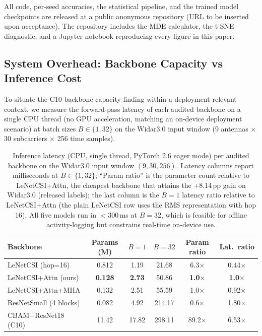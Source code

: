 \documentclass[11pt]{article}
\theoremstyle{definition}
\begin{document}
All code, per-seed accuracies, the statistical pipeline, and the trained model checkpoints are released at a public anonymous repository (URL to be inserted upon acceptance). The repository includes the MDE calculator, the t-SNE diagnostic, and a Jupyter notebook reproducing every figure in this paper.

\subsection{System Overhead: Backbone Capacity vs Inference Cost}
\label{sec:system_overhead}

To situate the C10 backbone-capacity finding within a deployment-relevant context, we measure the forward-pass latency of each audited backbone on a single CPU thread (no GPU acceleration, matching an on-device deployment scenario) at batch sizes $B \in \{1, 32\}$ on the Widar3.0 input window (9 antennas $\times$ 30 subcarriers $\times$ 256 time samples).

\begin{table}[h]
    \centering
    \caption{Inference latency (CPU, single thread, PyTorch 2.6 eager mode) per audited backbone on the Widar3.0 input window $(9, 30, 256)$. Latency columns report milliseconds at $B \in \{1, 32\}$; ``Param ratio'' is the parameter count relative to LeNetCSI+Attn, the cheapest backbone that attains the +8.14\,pp gain on Widar3.0 (released labels); the last column is the $B{=}1$ latency ratio relative to LeNetCSI+Attn (the plain LeNetCSI row uses the RMS representation with hop 16). All five models run in $<300$\,ms at $B = 32$, which is feasible for offline activity-logging but constrains real-time on-device use.}
    \label{tab:latency}
    \footnotesize
    \setlength{\tabcolsep}{4pt}
    \begin{tabular}{@{}l c c c c c@{}}
    \toprule
    Backbone & Params (M) & $B{=}1$ & $B{=}32$ & Param ratio & Lat.\ ratio \\
    \midrule
    LeNetCSI (hop=16)            & 0.812 & 1.19 & 21.68  & 6.3$\times$  & 0.44$\times$  \\
    LeNetCSI+Attn (ours)         & \textbf{0.128} & \textbf{2.73} & 50.86  & \textbf{1.0$\times$}  & \textbf{1.0$\times$}   \\
    LeNetCSI+Attn+MHA            & 0.132 & 2.51 & 55.59  & 1.0$\times$  & 0.92$\times$  \\
    ResNetSmall (4 blocks)       & 0.082 & 4.92 & 214.17 & 0.6$\times$  & 1.80$\times$  \\
    CBAM+ResNet18 (C10)          & 11.42 & 17.82 & 298.11 & 89.2$\times$ & 6.53$\times$  \\
    \bottomrule
    \end{tabular}
\end{table}
\end{document}
